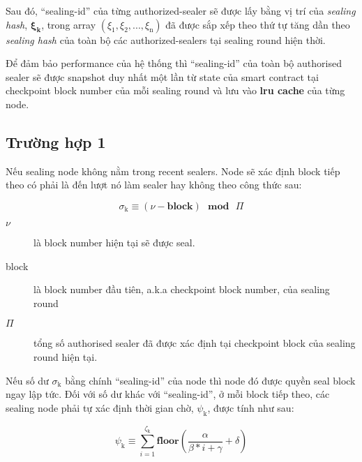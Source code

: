 \documentclass[12pt]{amsart}
\begin{document}
\begin{multicols}{2}
Sau đó, ``sealing-id'' của từng authorized-sealer sẽ được lấy bằng vị trí của \textit{sealing hash}, $\boldsymbol{\xi_k}$, trong array $(\xi_{\mathrm{1}}, \xi_{\mathrm{2}}, ..., \xi_{\mathrm{n}})$ đã được sắp xếp theo thứ tự tăng dần theo \textit{sealing hash} của toàn bộ các authorized-sealers tại sealing round hiện thời.

Để đảm bảo performance của hệ thống thì ``sealing-id'' của toàn bộ authorised sealer sẽ được snapshot duy nhất một lần từ state của smart contract tại checkpoint block number của mỗi sealing round và lưu vào \textbf{lru cache} của từng node.

\subsection{Trường hợp 1} Nếu sealing node không nằm trong recent sealers. Node sẽ xác định block tiếp theo có phải là đến lượt nó làm sealer hay không theo công thức sau:

\begin{equation}
\sigma_{\mathrm{k}} \equiv (\nu - \mathbf{block}) \ \ \ \mathbf{mod} \ \ \ \Pi
\end{equation}

\begin{description}
\item[$\nu$] là block number hiện tại sẽ được seal.
\item[block] là block number đầu tiên, a.k.a checkpoint block number, của sealing round
\item[$\Pi$] tổng số authorised sealer đã được xác định tại checkpoint block của sealing round hiện tại.
\end{description}

Nếu số dư $\sigma_{\mathrm{k}}$ bằng chính ``sealing-id'' của node thì node đó được quyền seal block ngay lập tức. Đối với số dư khác với ``sealing-id'', ở mỗi block tiếp theo, các sealing node phải tự xác định thời gian chờ, $\psi_{\mathrm{k}}$, được tính như sau:

\begin{equation}
\psi_{\mathrm{k}} \equiv \sum_{i=1}^{\zeta_\mathrm{k}} \mathbf{floor}(\frac{\alpha}{\beta*i+\gamma} + \delta)
\end{equation}




\end{multicols}
\end{document}

